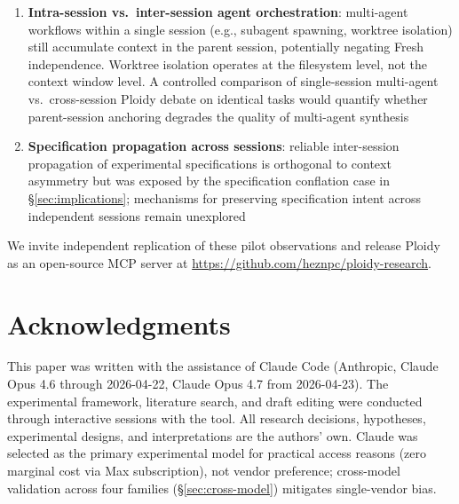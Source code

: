 \documentclass[11pt]{article}
\begin{document}
\begin{enumerate}[label=\arabic*., leftmargin=1.5em]
  \item \textbf{Intra-session vs.\ inter-session agent orchestration}: multi-agent workflows within a single session (e.g., subagent spawning, worktree isolation) still accumulate context in the parent session, potentially negating Fresh independence. Worktree isolation operates at the filesystem level, not the context window level. A controlled comparison of single-session multi-agent vs.\ cross-session Ploidy debate on identical tasks would quantify whether parent-session anchoring degrades the quality of multi-agent synthesis
  \item \textbf{Specification propagation across sessions}: reliable inter-session propagation of experimental specifications is orthogonal to context asymmetry but was exposed by the specification conflation case in \S\ref{sec:implications}; mechanisms for preserving specification intent across independent sessions remain unexplored
\end{enumerate}

We invite independent replication of these pilot observations and release Ploidy as an open-source MCP server at \url{https://github.com/heznpc/ploidy-research}.

\section*{Acknowledgments}

This paper was written with the assistance of Claude Code (Anthropic, Claude Opus 4.6 through 2026-04-22, Claude Opus 4.7 from 2026-04-23). The experimental framework, literature search, and draft editing were conducted through interactive sessions with the tool. All research decisions, hypotheses, experimental designs, and interpretations are the authors' own. Claude was selected as the primary experimental model for practical access reasons (zero marginal cost via Max subscription), not vendor preference; cross-model validation across four families (\S\ref{sec:cross-model}) mitigates single-vendor bias.


\end{document}
